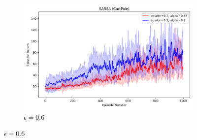 \documentclass[11pt, a4]{article}
\begin{document}
\begin{figure}[h]
\begin{subfigure}[h]{0.3\textwidth}
					\includegraphics[width=\textwidth]{../cartpole-v1/plots/sarsa_0.15_0.2vs0.2_0.2.png}
					\caption{$\epsilon = 0.6$}
				\end{subfigure}
				
				\vspace{0.1cm}
				

\end{figure}
\end{document}
